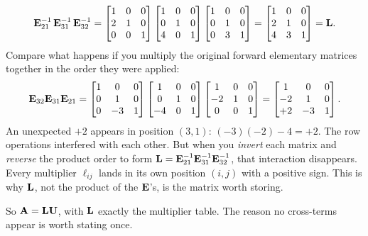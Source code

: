 \[
  \mathbf{E}_{21}^{-1}\,\mathbf{E}_{31}^{-1}\,\mathbf{E}_{32}^{-1}
  = \begin{bmatrix} 1&0&0\\2&1&0\\0&0&1 \end{bmatrix}
    \begin{bmatrix} 1&0&0\\0&1&0\\4&0&1 \end{bmatrix}
    \begin{bmatrix} 1&0&0\\0&1&0\\0&3&1 \end{bmatrix}
  = \begin{bmatrix} 1&0&0\\2&1&0\\4&3&1 \end{bmatrix} = \mathbf{L}.
\]
Compare what happens if you multiply the original forward elementary matrices together in the order they were applied:
\[
  \mathbf{E}_{32}\mathbf{E}_{31}\mathbf{E}_{21}
  = \begin{bmatrix} 1&0&0\\0&1&0\\0&-3&1 \end{bmatrix}
    \begin{bmatrix} 1&0&0\\0&1&0\\-4&0&1 \end{bmatrix}
    \begin{bmatrix} 1&0&0\\-2&1&0\\0&0&1 \end{bmatrix}
  = \begin{bmatrix} 1&0&0\\-2&1&0\\+2&-3&1 \end{bmatrix}.
\]
An unexpected $+2$ appears in position $(3,1)$: $(-3)(-2) - 4 = +2$. The row operations
interfered with each other. But when you \emph{invert} each matrix and \emph{reverse} the
product order to form $\mathbf{L} = \mathbf{E}_{21}^{-1}\mathbf{E}_{31}^{-1}\mathbf{E}_{32}^{-1}$, that
interaction disappears. Every multiplier $\ell_{ij}$ lands in its own position $(i,j)$ with a
positive sign. This is why $\mathbf{L}$, not the product of the $\mathbf{E}$'s, is the matrix
worth storing.

So $\mathbf{A} = \mathbf{L}\mathbf{U}$, with $\mathbf{L}$ exactly the multiplier table. The reason no
cross-terms appear is worth stating once.

